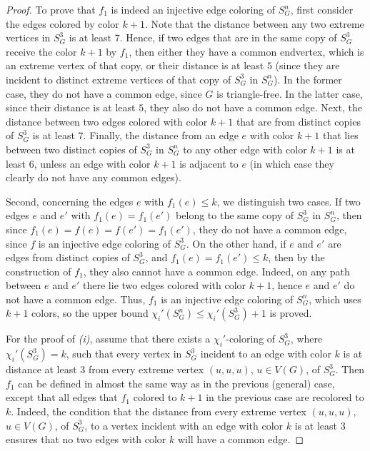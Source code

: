 \documentclass{article}
\begin{document}
\begin{proof}
To prove that $f_1$ is indeed an injective edge coloring of $S_G^n$, first consider the edges colored by color $k+1$. Note that the distance between any two extreme vertices in $S_G^3$ is at least $7$. Hence, if two edges that are in the same copy of $S_G^3$ receive the color $k+1$ by $f_1$, then either they have a common endvertex, which is an extreme vertex of that copy, or their distance is at least $5$ (since they are incident to distinct extreme vertices of that copy of $S_G^3$ in $S_G^n$). In the former case, they do not have a common edge, since $G$ is triangle-free. In the latter case, since their distance is at least $5$, they also do not have a common edge.  
Next, the distance between two edges colored with color $k+1$ that are from distinct copies of $S_G^3$ is at least $7$. Finally, the distance from an edge $e$ with color $k+1$ that lies between two distinct copies of $S_G^3$ in $S_G^n$ to any other edge with color $k+1$ is at least $6$, unless an edge with color $k+1$ is adjacent to $e$ (in which case they clearly do not have any common edges). 

Second, concerning the edges $e$ with $f_1(e)\le k$, we distinguish two cases. If two edges $e$ and $e'$ with $f_1(e)=f_1(e')$ belong to the same copy of $S_G^3$ in $S_G^n$, then since $f_1(e)=f(e)=f(e')=f_1(e')$, they do not have a common edge, since $f$ is an injective edge coloring of $S_G^3$. On the other hand, if $e$ and $e'$ are edges from distinct copies of $S_G^3$, and $f_1(e)=f_1(e')\le k$, then by the construction of $f_1$, they also cannot have a common edge. Indeed, on any path between $e$ and $e'$ there lie two edges colored with color $k+1$, hence $e$ and $e'$ do not have a common edge. Thus, $f_1$ is an injective edge coloring of $S_G^n$, which uses $k+1$ colors, so the upper bound $\chi_i'(S_G^n)\le \chi_i'(S_G^3)+1$ is proved. 

For the proof of {\it (i)}, assume that there exists a $\chi_i'$-coloring of $S_G^3$, where $\chi_i'(S_G^3)=k$, such that every vertex in $S_G^3$ incident to an edge with color $k$ is at distance at least $3$ from every extreme vertex $(u,u,u)$, $u\in V(G)$, of $S_G^3$. Then $f_1$ can be defined in almost the same way as in the previous (general) case, except that all edges that $f_1$ colored to $k+1$ in the previous case are recolored to $k$. Indeed, the condition that the distance from every extreme vertex $(u,u,u)$, $u\in V(G)$, of $S_G^3$, to a vertex incident with an edge with color $k$ is at least $3$ ensures that no two edges with color $k$ will have a common edge.


\end{proof}
\end{document}
